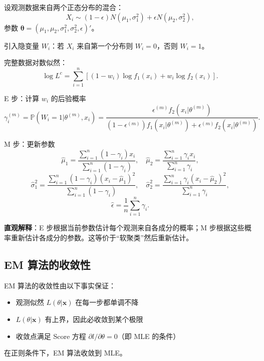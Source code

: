 \begin{example}[正态混合模型的 EM 算法]\label{ex:em-normal-mixture}
设观测数据来自两个正态分布的混合：
\[
X_i \sim (1-\epsilon) N(\mu_1, \sigma_1^2) + \epsilon N(\mu_2, \sigma_2^2),
\]
参数 $\boldsymbol{\theta} = (\mu_1, \mu_2, \sigma_1^2, \sigma_2^2, \epsilon)'$。

引入隐变量 $W_i$：若 $X_i$ 来自第一个分布则 $W_i = 0$，否则 $W_i = 1$。

完整数据对数似然：
\[
\log L^c = \sum_{i=1}^n \left[ (1-w_i)\log f_1(x_i) + w_i\log f_2(x_i) \right].
\label{eq:mixture-complete-loglikelihood}
\]

E 步：计算 $w_i$ 的后验概率
\[
\gamma_i^{(m)} = \mathbb{P}(W_i=1|\theta^{(m)}, x_i) = \frac{\epsilon^{(m)} f_2(x_i|\theta^{(m)})}{(1-\epsilon^{(m)}) f_1(x_i|\theta^{(m)}) + \epsilon^{(m)} f_2(x_i|\theta^{(m)})}.
\label{eq:mixture-e-step}
\]

M 步：更新参数
\[
\widehat{\mu}_1 = \frac{\sum_{i=1}^n (1-\gamma_i) x_i}{\sum_{i=1}^n (1-\gamma_i)}, \quad
\widehat{\mu}_2 = \frac{\sum_{i=1}^n \gamma_i x_i}{\sum_{i=1}^n \gamma_i},
\]
\[
\widehat{\sigma}_1^2 = \frac{\sum_{i=1}^n (1-\gamma_i)(x_i - \widehat{\mu}_1)^2}{\sum_{i=1}^n (1-\gamma_i)}, \quad
\widehat{\sigma}_2^2 = \frac{\sum_{i=1}^n \gamma_i(x_i - \widehat{\mu}_2)^2}{\sum_{i=1}^n \gamma_i},
\]
\[
\widehat{\epsilon} = \frac{1}{n}\sum_{i=1}^n \gamma_i.
\label{eq:mixture-m-step}
\]

\textbf{直观解释}：E 步根据当前参数估计每个观测来自各成分的概率；M 步根据这些概率重新估计各成分的参数。这等价于``软聚类''然后重新估计。
\end{example}

\subsection{EM 算法的收敛性}

EM 算法的收敛性由以下事实保证：

\begin{itemize}
\item 观测似然 $L(\theta|\mathbf{x})$ 在每一步都单调不降
\item $L(\theta|\mathbf{x})$ 有上界，因此必收敛到某个极限
\item 收敛点满足 Score 方程 $\partial l/\partial \theta = 0$（即 MLE 的条件）
\end{itemize}

在正则条件下，EM 算法收敛到 MLE。

